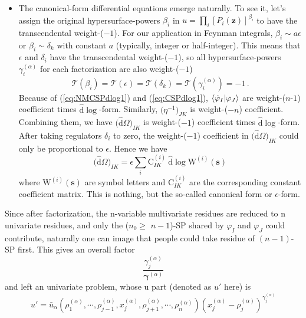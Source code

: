 \documentclass[a4paper,11pt]{article}
\newcommand{\nds}{\hat{\mathrm{d}}}
\newcommand{\ep}{\epsilon}
\def\eref#1{(\ref{#1})}
\begin{document}
\begin{itemize}
\item The canonical-form differential equations emerge naturally. 
To see it, let's assign the original hypersurface-powers $\beta_i$ in $u=\prod_i \left[P_i(\bm{z})\right]^{\beta_i}$ to  have the transcendental weight-($-1$). For our application in Feynman integrals, $\beta_i\sim a  \ep$ or $\beta_i \sim \delta_k$ with constant $a$ (typically, integer or half-integer). This means that $\ep$ and $\delta_i$ have the transcendental weight-($-1$), so all hypersurface-powers $\gamma^{(\alpha)}_i$ for each factorization are also weight-($-1$)
\begin{equation}
\mathcal{T}(\beta_i) = \mathcal{T}(\ep) = \mathcal{T}(\delta_k) = \mathcal{T}(\gamma^{(\alpha)}_i) = -1\, .
\end{equation}
Because of \eref{eq:NMCSPdlog1} and \eref{eq:CSPdlog1}, $\braket{\dot{\varphi}_I|\varphi_J}$ are weight-($n$-$1$) coefficient times $\nds \log$-form. Similarly,  $\big( \eta^{-1} \big)_{JK}$
is weight-($-n$) coefficient. Combining them, we have $\big( \nds \Omega \big)_{IK}$ is weight-($-1$) coefficient times $\nds \log$-form.  After taking regulators $\delta_i$ to  zero, the weight-($-1$) coefficient in $\big( \nds \Omega \big)_{IK}$ could only be proportional to $\ep$. Hence we have 
\begin{equation}
\big( \nds \Omega \big)_{IK} = \ep \sum_i \text{C}^{(i)}_{IK} ~ \nds \log \text{W}^{(i)}(\bm{s}) \label{eq:CDE}
\end{equation}
where $\text{W}^{(i)}(\bm{s})$ are symbol letters and $\text{C}^{(i)}_{IK}$ are the corresponding  constant coefficient matrix. This is nothing, but the so-called canonical form or $\ep$-form.
\end{itemize}
Since after factorization, the n-variable multivariate residues are reduced to n univariate residues, and only the ($n_0\geq$  $n-1$)-SP shared by $\varphi_I$ and $\varphi_J$  could contribute, naturally one can image that people could take residue of $(n-1)$-SP first. This gives an overall factor  
\begin{equation}
{\frac{{\gamma}^{(\alpha)}_j }{\bm{{\gamma}}^{(\alpha)}}}
\end{equation}
and left an univariate problem, whose u part (denoted as $u'$ here) is
\begin{equation}
u'=\bar{u}_\alpha(\rho_1^{(\alpha)},\cdots,\rho_{j-1}^{(\alpha)}, x_j^{(\alpha)},\rho_{j+1}^{(\alpha)},\cdots,\rho_{n}^{(\alpha)} ) \left( x_j^{(\alpha)} - \rho_j^{(\alpha)} \right)^{\gamma_j^{(\alpha)}}
\end{equation}
\end{document}
